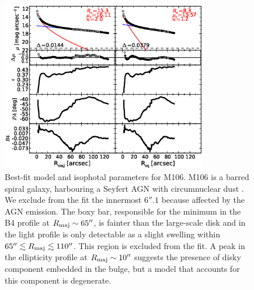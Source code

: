 \documentclass[preprint2]{emulateapj}
\newcommand{\fitfigurewidth}{0.8\textwidth}
\begin{document}
  \begin{figure}[h]
  \begin{center}
  \includegraphics[width=\fitfigurewidth]{images/m106_1Dfit.eps}
  \caption{Best-fit model and isophotal parameters for M106.
  M106 is a barred spiral galaxy, harbouring a Seyfert AGN \citep{veroncettyveron2006} 
  with circumnuclear dust \citep{martini2003}. 
  We exclude from the fit the innermost $6''.1$ because affected by the AGN emission.
  The boxy bar, responsible for the minimum in the B4 profile at $R_{\rm maj} \sim 65''$, 
  is fainter than the large-scale disk and in the light profile is only detectable as a slight swelling
  within $65'' \lesssim R_{\rm maj} \lesssim 110''$.
  This region is excluded from the fit.
  A peak in the ellipticity profile at $R_{\rm maj} \sim 10''$ suggests the presence of disky component embedded in the bulge, 
  but a model that accounts for this component is degenerate.
  }
  \end{center}
  \end{figure}
\end{document}
